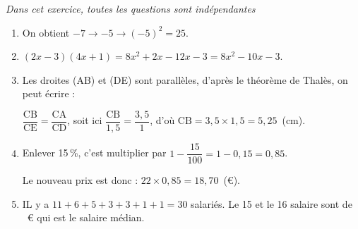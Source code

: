 
\medskip

\emph{Dans cet exercice, toutes les questions sont indépendantes}

\medskip

\begin{enumerate}
\item On obtient $- 7 \to - 5 \to (- 5)^2 = 25$.


\item %

$(2x - 3)(4x + 1) = 8x^2 + 2x  - 12x  - 3 = 8x^2 - 10x  - 3$.
\item Les droites (AB) et (DE) sont parallèles, d'après le théorème de Thalès, on peut écrire :

$\dfrac{\text{CB}}{\text{CE}} = \dfrac{\text{CA}}{\text{CD}}$, soit ici $\dfrac{\text{CB}}{1,5} = \dfrac{3,5}{1}$, d'où $\text{CB} = 3,5 \times 1,5 = 5,25$~(cm).

\item %

Enlever 15\,\%, c'est multiplier par $1 - \dfrac{15}{100} = 1 - 0,15 = 0,85$.

Le nouveau prix est donc : $22 \times 0,85 = 18,70$~(\euro).
\item %

%
IL y a $11 + 6 + 5 + 3 + 3 + 1 + 1 = 30$ salariés. Le 15 et le 16 salaire sont de ~\euro{} qui est le salaire médian.


\end{enumerate}
